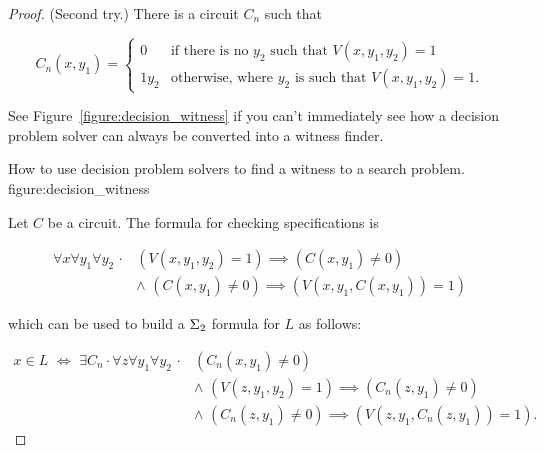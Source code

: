 \begin{proof}
(Second try.) There is a circuit $C_n$ such that

\begin{displaymath}
C_n(x,y_1) = \left\{
\begin{array}{ll}
0 & \textrm{if there is no}\,\, y_2 \,\,\textrm{such that}\,\, V(x,y_1,y_2) = 1 \\
1y_2 & \textrm{otherwise, where}\,\, y_2 \,\,\textrm{is such that}\,\, V(x,y_1,y_2) = 1.
\end{array} \right.
\end{displaymath}

See Figure~\ref{figure:decision_witness} if you can't immediately see how a decision problem solver can always be converted into a witness finder.

{How to use decision problem solvers to find a witness to a search problem.}
{figure:decision_witness}


Let $C$ be a circuit. The formula for checking specifications is

\begin{displaymath}
\begin{array}{rl}
\forall x \forall y_1 \forall y_2 \, \cdot & (V(x,y_1,y_2) = 1) \implies (C(x,y_1) \neq 0) \\
& \land \,\, (C(x,y_1) \neq 0) \implies (V(x,y_1,C(x,y_1)) = 1)
\end{array}
\end{displaymath}

which can be used to build a $\sigmatwo$ formula for $L$ as follows:

\begin{displaymath}
\begin{array}{rl}
x \in L \,\, \iff \,\, \exists C_n \cdot \forall z \forall y_1 \forall y_2 \, \cdot
& (C_n(x,y_1) \neq 0) \\
& \land \,\, (V(z,y_1,y_2)=1) \implies (C_n(z,y_1) \neq 0) \\
& \land \,\, (C_n(z,y_1) \neq 0) \implies (V(z, y_1, C_n(z,y_1))=1).
\end{array}
\end{displaymath}
\end{proof}


